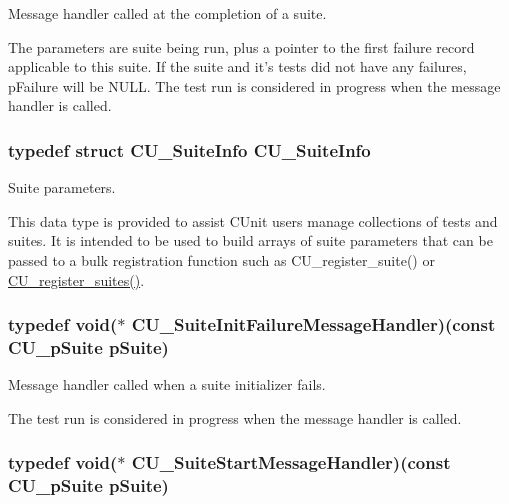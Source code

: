 Message handler called at the completion of a suite. 

The parameters are suite being run, plus a pointer to the first failure record applicable to this suite. If the suite and it's tests did not have any failures, p\-Failure will be N\-U\-L\-L. The test run is considered in progress when the message handler is called. \hypertarget{group__Framework_ga345177d10f56a80873124d47cae930f0}{
\subsubsection[{C\-U\-\_\-\-Suite\-Info}]{\setlength{\rightskip}{0pt plus 5cm}typedef struct {\bf C\-U\-\_\-\-Suite\-Info}  {\bf C\-U\-\_\-\-Suite\-Info}}}\label{group__Framework_ga345177d10f56a80873124d47cae930f0}


Suite parameters. 

This data type is provided to assist C\-Unit users manage collections of tests and suites. It is intended to be used to build arrays of suite parameters that can be passed to a bulk registration function such as C\-U\-\_\-register\-\_\-suite() or \hyperlink{group__Framework_ga331001da0a8bd8faececdb48e7ad3f96}{C\-U\-\_\-register\-\_\-suites()}. \hypertarget{group__Framework_ga53faf49a6045a1fc32c5a0287b800b65}{
\subsubsection[{C\-U\-\_\-\-Suite\-Init\-Failure\-Message\-Handler}]{\setlength{\rightskip}{0pt plus 5cm}typedef void($\ast$ C\-U\-\_\-\-Suite\-Init\-Failure\-Message\-Handler)(const {\bf C\-U\-\_\-p\-Suite} p\-Suite)}}\label{group__Framework_ga53faf49a6045a1fc32c5a0287b800b65}


Message handler called when a suite initializer fails. 

The test run is considered in progress when the message handler is called. \hypertarget{group__Framework_gab7f4df4360e8d2faa7e59571a1409448}{
\subsubsection[{C\-U\-\_\-\-Suite\-Start\-Message\-Handler}]{\setlength{\rightskip}{0pt plus 5cm}typedef void($\ast$ C\-U\-\_\-\-Suite\-Start\-Message\-Handler)(const {\bf C\-U\-\_\-p\-Suite} p\-Suite)}}\label{group__Framework_gab7f4df4360e8d2faa7e59571a1409448}


